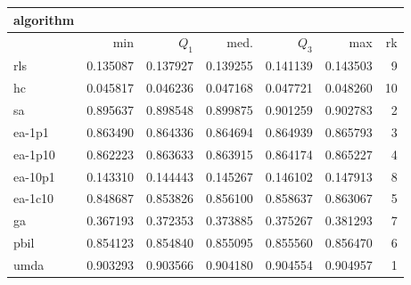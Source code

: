 \begin{tabular}{@{}l*{5}{>{{}}N{1}{3}}>{{}}N{2}{0}@{}}
\toprule
{algorithm} &  \\
\midrule
& {min} & {$Q_1$} & {med.} & {$Q_3$} & {max} & {rk}\\
\midrule
rls & 0.135087 & 0.137927 & 0.139255 & 0.141139 & 0.143503 & 9\\
hc & 0.045817 & 0.046236 & 0.047168 & 0.047721 & 0.048260 & 10\\
sa & 0.895637 & 0.898548 & 0.899875 & 0.901259 & 0.902783 & 2\\
ea-1p1 & 0.863490 & 0.864336 & 0.864694 & 0.864939 & 0.865793 & 3\\
ea-1p10 & 0.862223 & 0.863633 & 0.863915 & 0.864174 & 0.865227 & 4\\
ea-10p1 & 0.143310 & 0.144443 & 0.145267 & 0.146102 & 0.147913 & 8\\
ea-1c10 & 0.848687 & 0.853826 & 0.856100 & 0.858637 & 0.863067 & 5\\
ga & 0.367193 & 0.372353 & 0.373885 & 0.375267 & 0.381293 & 7\\
pbil & 0.854123 & 0.854840 & 0.855095 & 0.855560 & 0.856470 & 6\\
umda & {\color{blue}} 0.903293 & {\color{blue}} 0.903566 & {\color{blue}} 0.904180 & {\color{blue}} 0.904554 & {\color{blue}} 0.904957 & 1\\
\bottomrule
\end{tabular}
